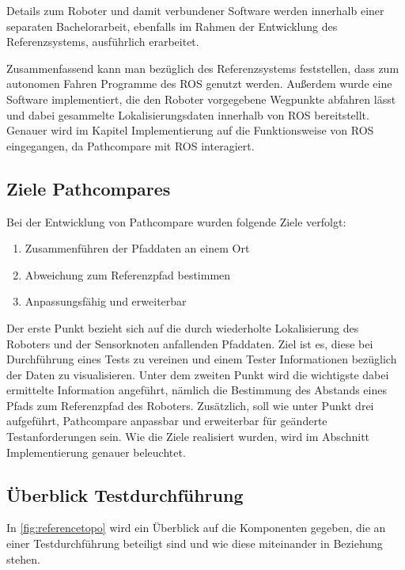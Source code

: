 Details zum Roboter und damit verbundener Software werden 
innerhalb einer separaten Bachelorarbeit, ebenfalls im Rahmen der
Entwicklung des Referenzsystems, ausführlich erarbeitet.

Zusammenfassend kann man bezüglich des Referenzsystems feststellen, dass zum autonomen Fahren
Programme des ROS genutzt werden. Außerdem wurde eine Software implementiert,
die den Roboter vorgegebene Wegpunkte abfahren lässt und dabei gesammelte
Lokalisierungsdaten innerhalb von ROS bereitstellt. Genauer wird im
Kapitel Implementierung auf die Funktionsweise von ROS eingegangen, da
Pathcompare mit ROS interagiert.

\subsection{Ziele Pathcompares}

Bei der Entwicklung von Pathcompare wurden folgende Ziele verfolgt:

\begin{enumerate}
  \item Zusammenführen der Pfaddaten an einem Ort
  \item Abweichung zum Referenzpfad bestimmen
  \item Anpassungsfähig und erweiterbar
\end{enumerate}

Der erste Punkt bezieht sich auf die durch wiederholte Lokalisierung des
Roboters und der Sensorknoten anfallenden Pfaddaten. Ziel ist es, diese bei
Durchführung eines Tests zu vereinen und einem Tester Informationen bezüglich
der Daten zu visualisieren. Unter dem zweiten Punkt wird die wichtigste dabei
ermittelte Information angeführt, nämlich die Bestimmung des Abstands eines
Pfads zum Referenzpfad des Roboters. Zusätzlich, soll wie unter Punkt drei
aufgeführt, Pathcompare anpassbar und erweiterbar für geänderte
Testanforderungen sein. Wie die Ziele realisiert wurden, wird im Abschnitt
Implementierung genauer beleuchtet.

\subsection{Überblick Testdurchführung}

In \autoref{fig:referencetopo} wird ein Überblick auf die Komponenten gegeben,
die an einer Testdurchführung beteiligt sind und wie diese miteinander in
Beziehung stehen.

